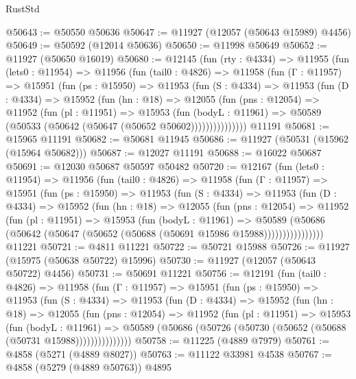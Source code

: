\begin{lexlean}{RustStd}
\begin{coremodule}
@50643 := @50550 @50636
@50647 := @11927 (@12057 (@50643 @15989) @4456)
@50649 := @50592 (@12014 @50636)
@50650 := @11998 @50649
@50652 := @11927 (@50650 @16019)
@50680 := @12145
    (fun (rty : @4334) =>
    @11955
      (fun (lets0 : @11954) =>
      @11956
        (fun (tail0 : @4826) =>
        @11958
          (fun (Γ : @11957) =>
          @15951
            (fun (ps : @15950) =>
            @11953
              (fun (S : @4334) =>
              @11953
                (fun (D : @4334) =>
                @15952
                  (fun (hn : @18) =>
                  @12055
                    (fun (pns : @12054) =>
                    @11952
                      (fun (pl : @11951) =>
                      @15953
                        (fun (bodyL : @11961) =>
                        @50589 (@50533 (@50642 (@50647 (@50652 @50602)))))))))))))))
    @11191
@50681 := @15965 @11191
@50682 := @50681 @11945
@50686 := @11927 (@50531 (@15962 (@15964 @50682)))
@50687 := @12027 @11191
@50688 := @16022 @50687
@50691 := @12030 @50687 @50597 @50482
@50720 := @12167
    (fun (lets0 : @11954) =>
    @11956
      (fun (tail0 : @4826) =>
      @11958
        (fun (Γ : @11957) =>
        @15951
          (fun (ps : @15950) =>
          @11953
            (fun (S : @4334) =>
            @11953
              (fun (D : @4334) =>
              @15952
                (fun (hn : @18) =>
                @12055
                  (fun (pns : @12054) =>
                  @11952
                    (fun (pl : @11951) =>
                    @15953
                      (fun (bodyL : @11961) =>
                      @50589
                        (@50686
                          (@50642 (@50647 (@50652 (@50688 (@50691 @15986 @15988))))))))))))))))
    @11221
@50721 := @4811 @11221
@50722 := @50721 @15988
@50726 := @11927 (@15975 (@50638 @50722) @15996)
@50730 := @11927 (@12057 (@50643 @50722) @4456)
@50731 := @50691 @11221
@50756 := @12191
    (fun (tail0 : @4826) =>
    @11958
      (fun (Γ : @11957) =>
      @15951
        (fun (ps : @15950) =>
        @11953
          (fun (S : @4334) =>
          @11953
            (fun (D : @4334) =>
            @15952
              (fun (hn : @18) =>
              @12055
                (fun (pns : @12054) =>
                @11952
                  (fun (pl : @11951) =>
                  @15953
                    (fun (bodyL : @11961) =>
                    @50589 (@50686 (@50726 (@50730 (@50652 (@50688 (@50731 @15988)))))))))))))))
@50758 := @11225 (@4889 @7979)
@50761 := @4858 (@5271 (@4889 @8027))
@50763 := @11122 @33981 @4538
@50767 := @4858 (@5279 (@4889 @50763)) @4895

\end{coremodule}
\end{lexlean}
